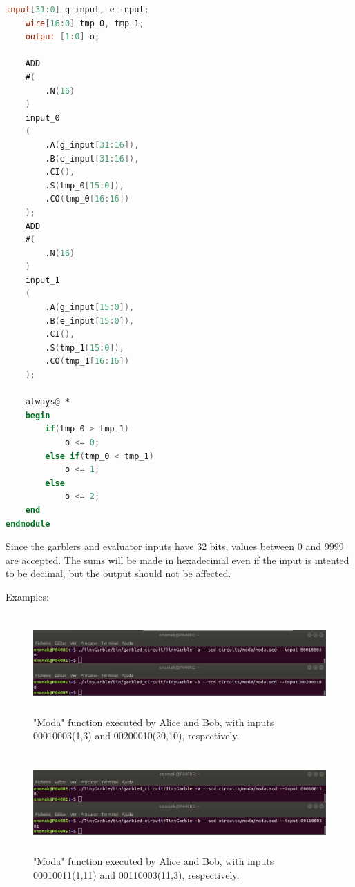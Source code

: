 \begin{refsection}
\begin{lstlisting}[caption={moda.v}, language=Verilog, captionpos=b]
	input[31:0] g_input, e_input;
	wire[16:0] tmp_0, tmp_1;
	output [1:0] o;

	ADD 
	#(
		.N(16)
	)
	input_0
	(
		.A(g_input[31:16]),
		.B(e_input[31:16]),
		.CI(),
		.S(tmp_0[15:0]),
		.CO(tmp_0[16:16])
	);
	ADD 
	#(
		.N(16)
	)
	input_1
	(
		.A(g_input[15:0]),
		.B(e_input[15:0]),
		.CI(),
		.S(tmp_1[15:0]),
		.CO(tmp_1[16:16])
	);	

	always@ *
	begin
		if(tmp_0 > tmp_1)
			o <= 0;
		else if(tmp_0 < tmp_1)
			o <= 1;
		else
			o <= 2;
	end
endmodule
\end{lstlisting}

\newpage
Since the garblers and evaluator inputs have 32 bits, values between 0 and 9999 are accepted. The sums will be made in hexadecimal even if the input is intented to be decimal, but the output should not be affected.

Examples:

\begin{figure}[H]
	\centering
	\includegraphics[width=1\textwidth, height=3.8cm]{./sdf/tiny_garble/figures/tinygarble_moda_0.png}
    \caption{"Moda" function executed by Alice and Bob, with inputs 00010003(1,3) and 00200010(20,10), respectively.}\label{fig:tinygarble_moda_0}
\end{figure}

\begin{figure}[H]
	\centering
	\includegraphics[width=1\textwidth, height=3.8cm]{./sdf/tiny_garble/figures/tinygarble_moda_1.png}
    \caption{"Moda" function executed by Alice and Bob, with inputs 00010011(1,11) and 00110003(11,3), respectively.}\label{fig:tinygarble_moda_1}
\end{figure}


\end{refsection}
